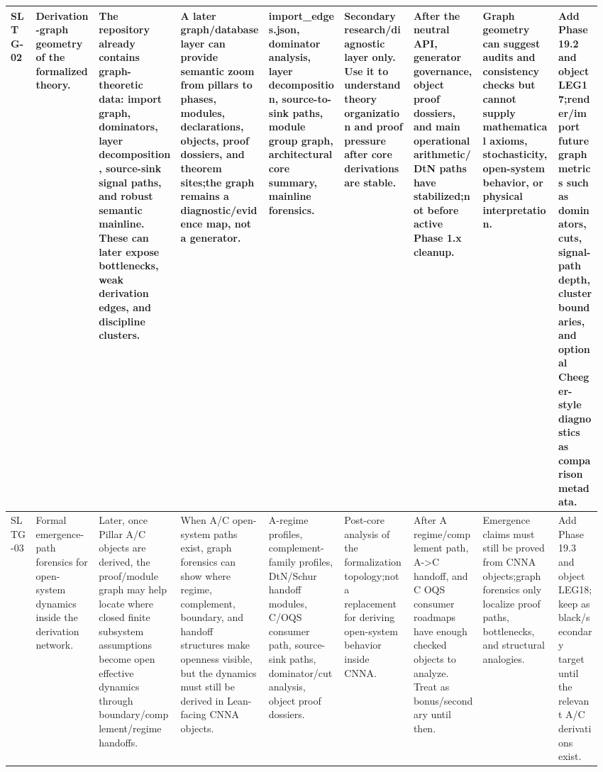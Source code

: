 \begin{longtable}{L{0.04\linewidth} L{0.105\linewidth} L{0.135\linewidth} L{0.145\linewidth} L{0.12\linewidth} L{0.115\linewidth} L{0.115\linewidth} L{0.12\linewidth} L{0.075\linewidth}}
SLTG-02 & Derivation-graph geometry of the formalized theory. & The repository already contains graph-theoretic data: import graph, dominators, layer decomposition, source-sink signal paths, and robust semantic mainline. These can later expose bottlenecks, weak derivation edges, and discipline clusters. & A later graph/\allowbreak{}database layer can provide semantic zoom from pillars to phases, modules, declarations, objects, proof dossiers, and theorem sites;\newline the graph remains a diagnostic/\allowbreak{}evidence map, not a generator. & import\_edges.json, dominator analysis, layer decomposition, source-to-sink paths, module group graph, architectural core summary, mainline forensics. & Secondary research/\allowbreak{}diagnostic layer only. Use it to understand theory organization and proof pressure after core derivations are stable. & After the neutral API, generator governance, object proof dossiers, and main operational arithmetic/\allowbreak{}DtN paths have stabilized;\newline not before active Phase 1.x cleanup. & Graph geometry can suggest audits and consistency checks but cannot supply mathematical axioms, stochasticity, open-system behavior, or physical interpretation. & Add Phase 19.2 and object LEG17;\newline render/\allowbreak{}import future graph metrics such as dominators, cuts, signal-path depth, cluster boundaries, and optional Cheeger-style diagnostics as comparison metadata.\\
\hline
\addlinespace[0.24em]
SLTG-03 & Formal emergence-path forensics for open-system dynamics inside the derivation network. & Later, once Pillar A/\allowbreak{}C objects are derived, the proof/\allowbreak{}module graph may help locate where closed finite subsystem assumptions become open effective dynamics through boundary/\allowbreak{}complement/\allowbreak{}regime handoffs. & When A/\allowbreak{}C open-system paths exist, graph forensics can show where regime, complement, boundary, and handoff structures make openness visible, but the dynamics must still be derived in Lean-facing CNNA objects. & A-regime profiles, complement-family profiles, DtN/\allowbreak{}Schur handoff modules, C/\allowbreak{}OQS consumer path, source-sink paths, dominator/\allowbreak{}cut analysis, object proof dossiers. & Post-core analysis of the formalization topology;\newline not a replacement for deriving open-system behavior inside CNNA. & After A regime/\allowbreak{}complement path, A->C handoff, and C OQS consumer roadmaps have enough checked objects to analyze. Treat as bonus/\allowbreak{}secondary until then. & Emergence claims must still be proved from CNNA objects;\newline graph forensics only localize proof paths, bottlenecks, and structural analogies. & Add Phase 19.3 and object LEG18;\newline keep as black/\allowbreak{}secondary target until the relevant A/\allowbreak{}C derivations exist.\\

\end{longtable}
